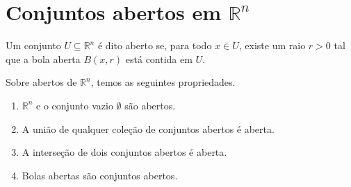 \section{Conjuntos abertos em $\mathbb R^n$}
\begin{definition}
    Um conjunto $U \subseteq \mathbb R^n$ é dito aberto se, para todo $x \in U$, existe um raio $r > 0$ tal que a bola aberta $B(x, r)$ está contida em $U$.
\end{definition}
\begin{proposition}
    Sobre abertos de $\mathbb R^n$, temos as seguintes propriedades.
    \begin{enumerate}
        \item $\mathbb R^n$ e o conjunto vazio $\emptyset$ são abertos.
        \item A união de qualquer coleção de conjuntos abertos é aberta.
        \item A interseção de dois conjuntos abertos é aberta.
        \item Bolas abertas são conjuntos abertos.
    \end{enumerate}
\end{proposition}
